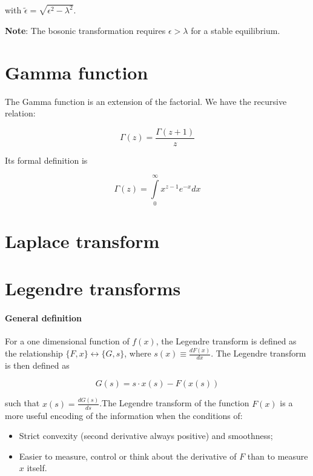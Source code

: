 \documentclass[11pt]{article} %
\newcommand{\1}{{\rm 1\hspace*{-0.38ex}%
\rule{0.1ex}{1.52ex}\hspace*{0.2ex}}}
\newcommand{\totaldel}[2]{\frac{d #1}{d #2}}
\begin{document}
with $\tilde{\epsilon} = \sqrt{\epsilon^2 - \lambda^2}$. 

\textbf{Note}: The bosonic transformation requires $\epsilon > \lambda$ for a stable equilibrium.

\section{Gamma function}

The Gamma function is an extension of the factorial. We have the recursive relation:

\begin{equation}
\Gamma(z) = \frac{\Gamma(z+1)}{z}
\end{equation}

Its formal definition is 

\begin{equation}
\Gamma(z) = \int\limits_0^{\infty} x^{z-1} e^{-x} dx
\end{equation}

\section{Laplace transform} \label{laplaceTrans}



\section{Legendre transforms} \label{legendreTrans}

\paragraph{General definition}

For a one dimensional function of $f(x)$, the Legendre transform is defined as the relationship $\{F,x\} \leftrightarrow \{G,s\}$, where $s(x) \equiv \totaldel{F(x)}{x}$. The Legendre transform is then defined as 

\begin{equation}
G(s)=s \cdot x(s) - F(x(s))
\end{equation}

such that $x(s) = \totaldel{G(s)}{s}$.The Legendre transform of the function $F(x)$  is a more useful encoding of the information when the conditions of:

\begin{itemize}
\item Strict convexity (second derivative always positive) and smoothness;
\item Easier to measure, control or think about the derivative of $F$ than to measure $x$ itself.
\end{itemize}
\end{document}
